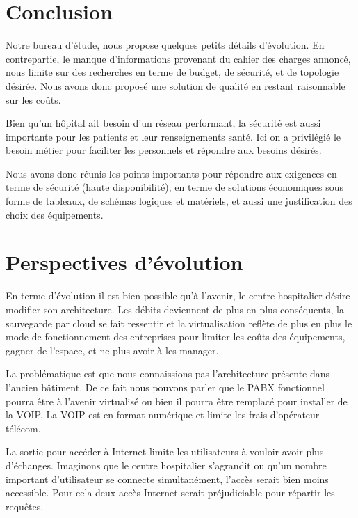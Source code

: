 \section*{Conclusion}

Notre bureau d'étude, nous propose quelques petits détails d'évolution.
En contrepartie, le manque d'informations provenant du cahier des charges annoncé, nous limite sur des recherches en terme de budget, de sécurité, et de topologie désirée.
Nous avons donc proposé une solution de qualité en restant raisonnable sur les coûts.

Bien qu'un hôpital ait besoin d'un réseau performant, la sécurité est aussi importante pour les patients et leur renseignements santé.
Ici on a privilégié le besoin métier pour faciliter les personnels et répondre aux besoins désirés.

Nous avons donc réunis les points importants pour répondre aux exigences en terme de sécurité (haute disponibilité), en terme de solutions économiques sous forme de tableaux, de schémas logiques et matériels, et aussi une justification des choix des équipements.


\section*{Perspectives d'évolution}


En terme d’évolution il est bien possible qu’à l’avenir, le centre hospitalier désire modifier son architecture. Les débits deviennent de plus en plus conséquents, la sauvegarde par cloud se fait ressentir et la virtualisation reflète de plus en plus le mode de fonctionnement des entreprises pour limiter les coûts des équipements, gagner de l’espace, et ne plus avoir à les manager.

La problématique est que nous connaissions pas l’architecture présente dans l’ancien bâtiment. De ce fait nous pouvons parler que le PABX fonctionnel pourra être à l’avenir virtualisé ou bien il pourra être remplacé pour installer de la VOIP. La VOIP est en format numérique et limite les frais d’opérateur télécom.

La sortie pour accéder à Internet limite les utilisateurs à vouloir avoir plus d’échanges. Imaginons que le centre hospitalier s'agrandit ou qu’un nombre important d’utilisateur se connecte simultanément, l’accès serait bien moins accessible. Pour cela deux accès Internet serait préjudiciable pour répartir les requêtes.

